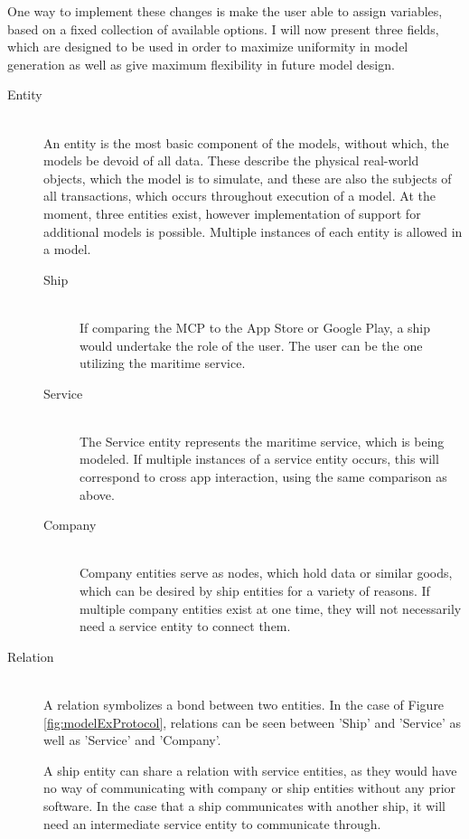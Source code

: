 One way to implement these changes is make the user able to assign variables, based on a fixed collection of available options. I will now present three fields, which are designed to be used in order to maximize uniformity in model generation as well as give maximum flexibility in future model design.
\begin{description}
	\item[Entity]\ \\
	An entity is the most basic component of the models, without which, the models be devoid of all data. These describe the physical real-world objects, which the model is to simulate, and these are also the subjects of all transactions, which occurs throughout execution of a model. At the moment, three entities exist, however implementation of support for additional models is possible.
	Multiple instances of each entity is allowed in a model.\newpage
	\begin{description}
		\item[Ship]\ \\
			If comparing the MCP to the App Store or Google Play, a ship would undertake the role of the user. The user can be the one utilizing the maritime service.
		\item[Service]\ \\
			The Service entity represents the maritime service, which is being modeled. If multiple instances of a service entity occurs, this will correspond to cross app interaction, using the same comparison as above.
		\item[Company]\ \\
			Company entities serve as nodes, which hold data or similar goods, which can be desired by ship entities for a variety of reasons. If multiple company entities exist at one time, they will not necessarily need a service entity to connect them. 
	\end{description}
	\item[Relation]\ \\
		A relation symbolizes a bond between two entities. In the case of Figure \ref{fig:modelExProtocol}, relations can be seen between 'Ship' and 'Service' as well as 'Service' and 'Company'.

		A ship entity can share a relation with service entities, as they would have no way of communicating with company or ship entities without any prior software. In the case that a ship communicates with another ship, it will need an intermediate service entity to communicate through.


\end{description}
